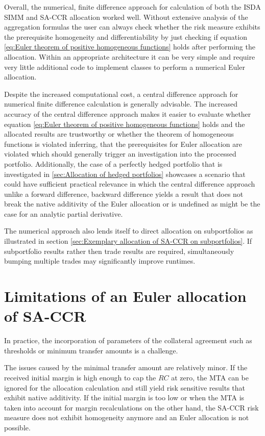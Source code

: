 \documentclass[../Thesis_AHoecherl.tex]{subfiles}
\begin{document}
    Overall, the numerical, finite difference approach for calculation of both the \gls{ISDA SIMM} and \gls{SA-CCR} allocation worked well. Without extensive analysis of the aggregation formulas the user can always check whether the risk measure exhibits the prerequisite homogeneity and differentiability by just checking if equation \ref{eq:Euler theorem of positive homogeneous functions} holds after performing the allocation. 
    Within an appropriate architecture it can be very simple and require very little additional code to implement classes to perform a numerical Euler allocation.
    
    Despite the increased computational cost, a central difference approach for numerical finite difference calculation is generally advisable.
    The increased accuracy of the central difference approach makes it easier to evaluate whether equation \ref{eq:Euler theorem of positive homogeneous functions} holds and the allocated results are trustworthy or whether the theorem of homogeneous functions is violated inferring, that the prerequisites for Euler allocation are violated which should generally trigger an investigation into the processed portfolio.
    Additionally, the case of a perfectly hedged portfolio that is investigated in \ref{sec:Allocation of hedged portfolios} showcases a scenario that could have sufficient practical relevance in which the central difference approach unlike a forward difference, backward difference yields a result that does not break the native additivity of the Euler allocation or is undefined as might be the case for an analytic partial derivative.

    The numerical approach also lends itself to direct allocation on subportfolios as illustrated in section \ref{sec:Exemplary allocation of SA-CCR on subportfolios}.
    If subportfolio results rather then trade results are required, simultaneously bumping multiple trades may significantly improve runtimes.

    \section{Limitations of an Euler allocation of SA-CCR\label{Limitations of an Euler allocation of SA-CCR}}

    In practice, the incorporation of parameters of the collateral agreement such as thresholds or minimum transfer amounts is a challenge.

    The issues caused by the minimal transfer amount are relatively minor.
    If the received initial margin is high enough to cap the $RC$ at zero, the \gls{MTA} can be ignored for the allocation calculation and still yield risk sensitive results that exhibit native additivity. If the initial margin is too low or when the \gls{MTA} is taken into account for margin recalculations on the other hand, the \gls{SA-CCR} risk measure does not exhibit homogeneity anymore and an Euler allocation is not possible.
    
\end{document}
